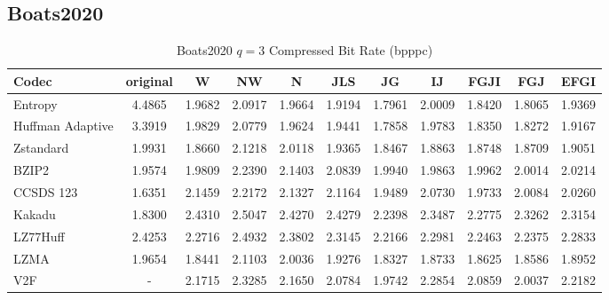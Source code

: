 \documentclass{article}
\begin{document}
\subsection{Boats2020}
\begin{table}[h!]
\centering
\caption{Boats2020 $q=3$ Compressed Bit Rate (bpppc)}
\begin{tabular}{|l|cccccccccc|}
\hline
Codec &  original &      W &     NW &      N &    JLS &     JG &     IJ &   FGJI &    FGJ &   EFGI \\
\hline
Entropy & 4.4865 & 1.9682 & 2.0917 & 1.9664 & 1.9194 & 1.7961 & 2.0009 & 1.8420 & 1.8065 & 1.9369 \\
\hline
Huffman Adaptive &    3.3919 & 1.9829 & 2.0779 & 1.9624 & 1.9441 & 1.7858 & 1.9783 & 1.8350 & 1.8272 & 1.9167 \\
Zstandard        &    1.9931 & 1.8660 & 2.1218 & 2.0118 & 1.9365 & 1.8467 & 1.8863 & 1.8748 & 1.8709 & 1.9051 \\
BZIP2            &    1.9574 & 1.9809 & 2.2390 & 2.1403 & 2.0839 & 1.9940 & 1.9863 & 1.9962 & 2.0014 & 2.0214 \\
CCSDS 123        &    1.6351 & 2.1459 & 2.2172 & 2.1327 & 2.1164 & 1.9489 & 2.0730 & 1.9733 & 2.0084 & 2.0260 \\
Kakadu           &    1.8300 & 2.4310 & 2.5047 & 2.4270 & 2.4279 & 2.2398 & 2.3487 & 2.2775 & 2.3262 & 2.3154 \\
LZ77Huff         &    2.4253 & 2.2716 & 2.4932 & 2.3802 & 2.3145 & 2.2166 & 2.2981 & 2.2463 & 2.2375 & 2.2833 \\
LZMA             &    1.9654 & 1.8441 & 2.1103 & 2.0036 & 1.9276 & 1.8327 & 1.8733 & 1.8625 & 1.8586 & 1.8952 \\
V2F              &   - & 2.1715 & 2.3285 & 2.1650 & 2.0784 & 1.9742 & 2.2854 & 2.0859 & 2.0037 & 2.2182 \\
\hline
\end{tabular}
\end{table}
\end{document}
